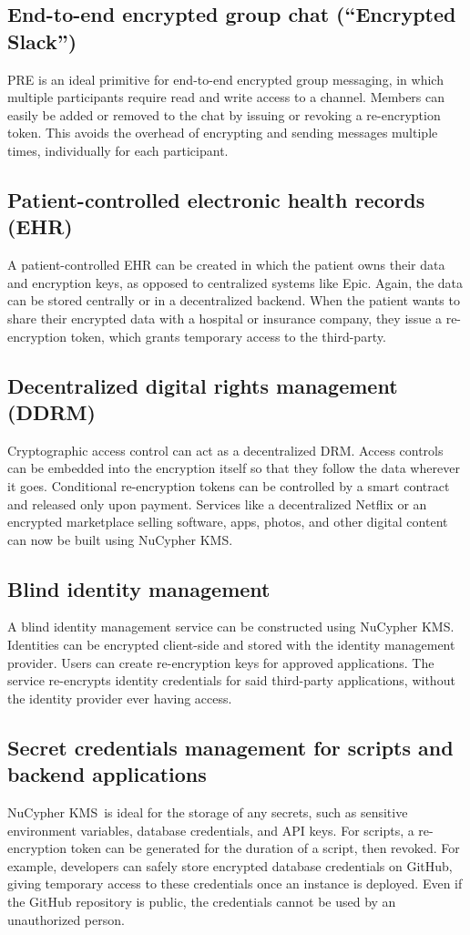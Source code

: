 \documentclass[longbibliography,nofootinbib]{revtex4-1}
\newcommand{\kms}{NuCypher KMS}
\begin{document}
\subsection{End-to-end encrypted group chat (``Encrypted Slack'')}
PRE is an ideal primitive for end-to-end encrypted group messaging, in which multiple participants require read and write
access to a channel. Members can easily be added or removed to the chat by issuing or revoking a re-encryption token.
This avoids the overhead of encrypting and sending messages multiple times, individually for each participant.

\subsection{Patient-controlled electronic health records (EHR)}
A patient-controlled EHR can be created in which the patient owns their data and encryption keys, as opposed to centralized
systems like Epic.
Again, the data can be stored centrally or in a decentralized backend.
When the patient wants to share their encrypted data with a hospital or insurance company, they issue a re-encryption token,
which grants temporary access to the third-party.

\subsection{Decentralized digital rights management (DDRM)}
\label{sec:drm}
Cryptographic access control can act as a decentralized DRM.
Access controls can be embedded into the encryption itself so that they follow the data wherever it goes.
Conditional re-encryption tokens can be controlled by a smart contract and released only upon payment.
Services like a decentralized Netflix or an encrypted marketplace selling software, apps, photos, and other digital content
can now be built using \kms.

\subsection{Blind identity management}
A blind identity management service can be constructed using \kms. Identities can be encrypted client-side and stored with the
identity management provider. Users can create re-encryption keys for approved applications. The service re-encrypts identity
credentials for said third-party applications, without the identity provider ever having access.

\subsection{Secret credentials management for scripts and backend applications}
\kms~is ideal for the storage of any secrets, such as sensitive environment variables, database credentials, and API keys.
For scripts, a re-encryption token can be generated for the duration of a script, then revoked.
For example, developers can safely store encrypted database credentials on GitHub, giving temporary access to these credentials
once an instance is deployed.
Even if the GitHub repository is public, the credentials cannot be used by an unauthorized person.
\end{document}
